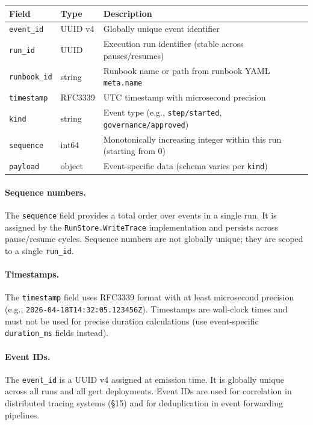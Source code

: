 \begin{center}
\begin{tabular}{llp{7cm}}
\textbf{Field} & \textbf{Type} & \textbf{Description} \\
\hline
\texttt{event\_id} & UUID v4 & Globally unique event identifier \\
\texttt{run\_id} & UUID & Execution run identifier (stable across pauses/resumes) \\
\texttt{runbook\_id} & string & Runbook name or path from runbook YAML \texttt{meta.name} \\
\texttt{timestamp} & RFC3339 & UTC timestamp with microsecond precision \cite{rfc3339} \\
\texttt{kind} & string & Event type (e.g., \texttt{step/started}, \texttt{governance/approved}) \\
\texttt{sequence} & int64 & Monotonically increasing integer within this run (starting from 0) \\
\texttt{payload} & object & Event-specific data (schema varies per \texttt{kind}) \\
\end{tabular}
\end{center}

\paragraph{Sequence numbers.} The \texttt{sequence} field provides a total order over events in a single run. It is assigned by the \texttt{RunStore.WriteTrace} implementation and persists across pause/resume cycles. Sequence numbers are not globally unique; they are scoped to a single \texttt{run\_id}.

\paragraph{Timestamps.} The \texttt{timestamp} field uses RFC3339 format with at least microsecond precision (e.g., \texttt{2026-04-18T14:32:05.123456Z}). Timestamps are wall-clock times and must not be used for precise duration calculations (use event-specific \texttt{duration\_ms} fields instead).

\paragraph{Event IDs.} The \texttt{event\_id} is a UUID v4 assigned at emission time. It is globally unique across all runs and all gert deployments. Event IDs are used for correlation in distributed tracing systems (§15) and for deduplication in event forwarding pipelines.

